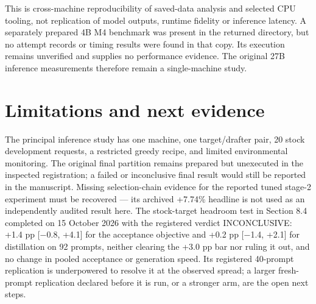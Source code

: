 \documentclass[
  11pt,
]{article}
\begin{document}
This is cross-machine reproducibility of saved-data analysis and
selected CPU tooling, not replication of model outputs, runtime fidelity
or inference latency. A separately prepared 4B M4 benchmark was present
in the returned directory, but no attempt records or timing results were
found in that copy. Its execution remains unverified and supplies no
performance evidence. The original 27B inference measurements therefore
remain a single-machine study.

\section{Limitations and next
evidence}\label{limitations-and-next-evidence}

The principal inference study has one machine, one target/drafter pair,
20 stock development requests, a restricted greedy recipe, and limited
environmental monitoring. The original final partition remains prepared
but unexecuted in the inspected registration; a failed or inconclusive
final result would still be reported in the manuscript. Missing
selection-chain evidence for the reported tuned stage-2 experiment must
be recovered --- its archived +7.74\% headline is not used as an
independently audited result here. The stock-target headroom test in
Section 8.4 completed on 15 October 2026 with the registered verdict
INCONCLUSIVE: +1.4 pp {[}−0.8, +4.1{]} for the acceptance objective and
+0.2 pp {[}−1.4, +2.1{]} for distillation on 92 prompts, neither
clearing the +3.0 pp bar nor ruling it out, and no change in pooled
acceptance or generation speed. Its registered 40-prompt replication is
underpowered to resolve it at the observed spread; a larger fresh-prompt
replication declared before it is run, or a stronger arm, are the open
next steps.
\end{document}
